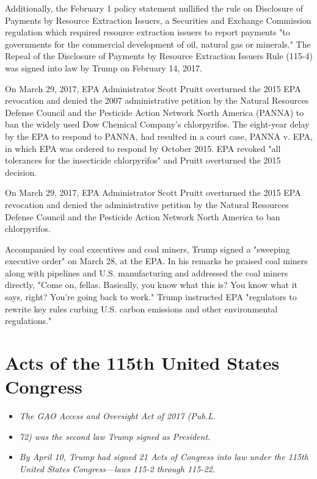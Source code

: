 Additionally, the February 1 policy statement nullified the rule on
Disclosure of Payments by Resource Extraction Issuers, a Securities and
Exchange Commission regulation which required resource extraction
issuers to report payments "to governments for the commercial
development of oil, natural gas or minerals." The Repeal of the
Disclosure of Payments by Resource Extraction Issuers Rule (115-4) was
signed into law by Trump on February 14, 2017.

On March 29, 2017, EPA Administrator Scott Pruitt overturned the 2015
EPA revocation and denied the 2007 administrative petition by the
Natural Resources Defense Council and the Pesticide Action Network North
America (PANNA) to ban the widely used Dow Chemical Company's
chlorpyrifos. The eight-year delay by the EPA to respond to PANNA, had
resulted in a court case, PANNA v. EPA, in which EPA was ordered to
respond by October 2015. EPA revoked "all tolerances for the insecticide
chlorpyrifos" and Pruitt overturned the 2015 decision.

On March 29, 2017, EPA Administrator Scott Pruitt overturned the 2015
EPA revocation and denied the administrative petition by the Natural
Resources Defense Council and the Pesticide Action Network North America
to ban chlorpyrifos.

Accompanied by coal executives and coal miners, Trump signed a "sweeping
executive order" on March 28, at the EPA. In his remarks he praised coal
miners along with pipelines and U.S. manufacturing and addressed the
coal miners directly, "Come on, fellas. Basically, you know what this
is? You know what it says, right? You're going back to work." Trump
instructed EPA "regulators to rewrite key rules curbing U.S. carbon
emissions and other environmental regulations."

\section{Acts of the 115th United States
Congress}\label{acts-of-the-115th-united-states-congress}

\begin{itemize}
\item
  \emph{The GAO Access and Oversight Act of 2017 (Pub.L.}
\item
  \emph{72) was the second law Trump signed as President.}
\item
  \emph{By April 10, Trump had signed 21 Acts of Congress into law under
  the 115th United States Congress---laws 115-2 through 115-22.}
\end{itemize}

